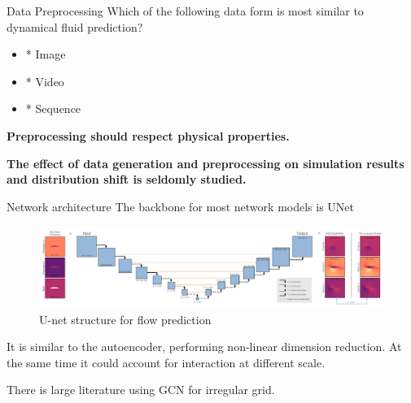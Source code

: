 \documentclass{beamer}
\begin{document}
\begin{frame}{Data Preprocessing}
	Which of the following data form is most similar to dynamical fluid prediction?
	\begin{itemize}
		\item * Image 
		\item * Video
		\item * Sequence
	\end{itemize}

	\textbf{Preprocessing should respect physical properties.}

	\textbf{The effect of data generation and preprocessing on simulation results and distribution shift is seldomly studied.}
\end{frame}

\begin{frame}{Network architecture}
	The backbone for most network models is UNet
	\begin{figure}[ht]
          \centering
          \centerline{\includegraphics[width=1.1\linewidth]{fig/Unet.png}}
          \caption{U-net structure for flow prediction\footnotemark}
\end{figure}

	It is similar to the autoencoder, performing non-linear dimension reduction.
	At the same time it could account for interaction at different scale.

	There is large literature using GCN for irregular grid.
\end{frame}
\end{document}
